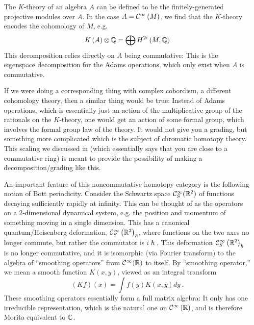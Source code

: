 The $K$-theory of an algebra $A$ can be defined to be the finitely-generated projective
modules over $A$. In the case $A = \mathcal{C}^\infty\left(M\right)$, we find that the $K$-theory
encodes the cohomology of $M$, e.g. 
\begin{equation*}
K\left(A\right) \otimes \mathbb{Q} = 
\bigoplus
H^{2i}\left(M , \mathbb{Q}\right)
\end{equation*}
This decomposition relies directly on $A$ being commutative:
This is the eigenspace decomposition for the Adams operations, which only exist when $A$
is commutative. 

If we were doing a corresponding thing with complex cobordism, a different cohomology
theory, then a similar thing would be true:
Instead of Adams operations, which is essentially just an action of the multiplicative
group of the rationals on the $K$-theory, 
one would get an action of some formal group, which involves the formal group law of the
theory. 
It would not give you a grading, but something more complicated 
which is the subject of chromatic homotopy theory.
This scaling we discussed in 
(which essentially says that you are close to a commutative ring)
is meant to provide the possibility of making a decomposition/grading like this.


An important feature of this noncommutative homotopy category is the following notion of
Bott periodicity.
Consider the Schwartz space $\mathcal{C}^\infty_S(\mathbb{R}^2)$ of functions decaying sufficiently rapidly
at infinity.
This can be thought of as the operators on a $2$-dimensional dynamical system, e.g. the
position and momentum of something moving in a single dimension. 
This has a canonical quantum/Heisenberg deformation,
$\mathcal{C}^\infty_S\left(\mathbb{R}^2\right)_{\hslash}$, 
where functions on the two axes no longer commute, but rather the commutator is $i\hslash$. 
This deformation 
$\mathcal{C}^\infty_S\left(\mathbb{R}^2\right)_{\hslash}$ is no longer commutative, and it is isomorphic
(via Fourier transform) to the algebra of ``smoothing operators'' from
$\mathcal{C}^\infty(\mathbb{R})$ to itself.
By ``smoothing operator,'' we mean a smooth function $K\left(x,y\right)$, viewed as an integral transform
\begin{equation*}
\left(Kf\right)\left(x\right) = \int f\left(y\right) K\left(x,y\right) dy \ .
\end{equation*}
These smoothing operators essentially form a full matrix algebra:
It only has one irreducible representation, which is the natural one on
$\mathcal{C}^\infty\left(\mathbb{R}\right)$, and is therefore Morita equivalent to $\mathbb{C}$. 

